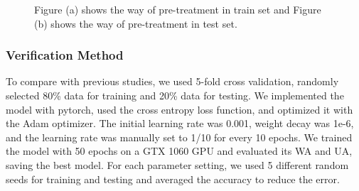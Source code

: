 \documentclass[10pt, conference, compsocconf]{IEEEtran}
\begin{document}
\begin{figure}[h]
	
	\centering
	\subfigcapskip=5pt
	\caption{Figure (a) shows the way of pre-treatment in train set and Figure (b) shows the way of pre-treatment in test set.}
	\label{pre-treat}
	
\end{figure}

\subsubsection{Verification Method}
To compare with previous studies, we used 5-fold cross validation, randomly selected 80\% data for training and 20\% data for testing. We implemented the model with pytorch, used the cross entropy loss function, and optimized it with the Adam optimizer. The initial learning rate was 0.001, weight decay was 1e-6, and the learning rate was manually set to 1/10 for every 10 epochs. We trained the model with 50 epochs on a GTX 1060 GPU and evaluated its WA and UA, saving the best model. For each parameter setting, we used 5 different random seeds for training and testing and averaged the accuracy to reduce the error.
\end{document}
